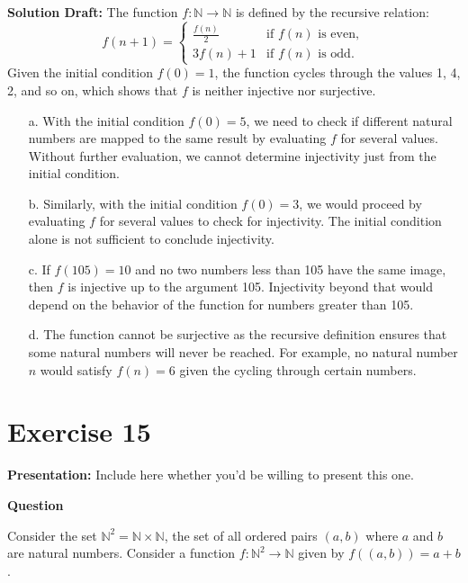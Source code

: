 \documentclass{article}
\begin{document}
\noindent\textbf{Solution Draft:} 
The function \( f : \mathbb{N} \rightarrow \mathbb{N} \) is defined by the recursive relation:
\[
f(n + 1) = \begin{cases}
\frac{f(n)}{2} & \text{if } f(n) \text{ is even}, \\
3f(n) + 1 & \text{if } f(n) \text{ is odd}.
\end{cases}
\]
Given the initial condition \( f(0) = 1 \), the function cycles through the values 1, 4, 2, and so on, which shows that \( f \) is neither injective nor surjective.

\begin{enumerate}
\item[a.]
With the initial condition \( f(0) = 5 \), we need to check if different natural numbers are mapped to the same result by evaluating \( f \) for several values. Without further evaluation, we cannot determine injectivity just from the initial condition.

\item[b.]
Similarly, with the initial condition \( f(0) = 3 \), we would proceed by evaluating \( f \) for several values to check for injectivity. The initial condition alone is not sufficient to conclude injectivity.

\item[c.]
If \( f(105) = 10 \) and no two numbers less than 105 have the same image, then \( f \) is injective up to the argument 105. Injectivity beyond that would depend on the behavior of the function for numbers greater than 105.

\item[d.]
The function cannot be surjective as the recursive definition ensures that some natural numbers will never be reached. For example, no natural number \( n \) would satisfy \( f(n) = 6 \) given the cycling through certain numbers.
\end{enumerate}

\section*{Exercise 15}  

\noindent\textbf{Presentation:} Include here whether you'd be willing to present this one. 

\vspace{0.5cm} %

\noindent\textbf{Question}

Consider the set \( \mathbb{N}^2 = \mathbb{N} \times \mathbb{N} \), the set of all ordered pairs \( (a, b) \) where \( a \) and \( b \) are natural numbers. Consider a function \( f : \mathbb{N}^2 \rightarrow \mathbb{N} \) given by \( f((a, b)) = a + b \).
\end{document}
